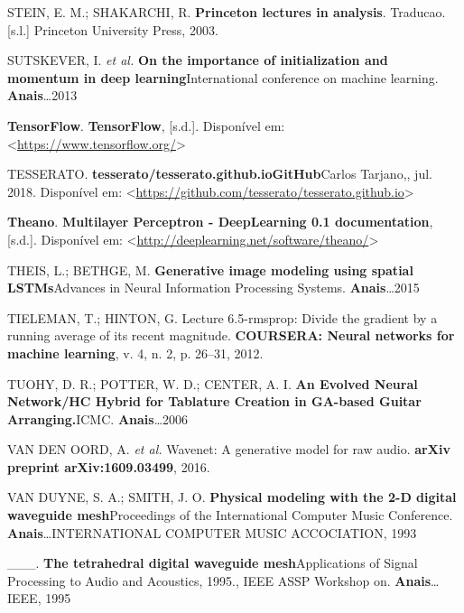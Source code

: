 \documentclass[]{article}
\begin{document}
\leavevmode\hypertarget{ref-stein2003princeton}{}%
STEIN, E. M.; SHAKARCHI, R. \textbf{Princeton lectures in analysis}.
Traducao. {[}s.l.{]} Princeton University Press, 2003.

\leavevmode\hypertarget{ref-sutskever2013importance}{}%
SUTSKEVER, I. \emph{et al.} \textbf{On the importance of initialization
and momentum in deep learning}International conference on machine
learning. \textbf{Anais}\ldots{}2013

\leavevmode\hypertarget{ref-tensorflow}{}%
\textbf{TensorFlow}. \textbf{TensorFlow}, {[}s.d.{]}. Disponível em:
\textless{}\url{https://www.tensorflow.org/}\textgreater{}

\leavevmode\hypertarget{ref-tesserato_2018}{}%
TESSERATO. \textbf{tesserato/tesserato.github.io}\textbf{GitHub}Carlos
Tarjano,, jul. 2018. Disponível em:
\textless{}\url{https://github.com/tesserato/tesserato.github.io}\textgreater{}

\leavevmode\hypertarget{ref-theano}{}%
\textbf{Theano}. \textbf{Multilayer Perceptron - DeepLearning 0.1
documentation}, {[}s.d.{]}. Disponível em:
\textless{}\url{http://deeplearning.net/software/theano/}\textgreater{}

\leavevmode\hypertarget{ref-theis2015generative}{}%
THEIS, L.; BETHGE, M. \textbf{Generative image modeling using spatial
LSTMs}Advances in Neural Information Processing Systems.
\textbf{Anais}\ldots{}2015

\leavevmode\hypertarget{ref-tieleman2012lecture}{}%
TIELEMAN, T.; HINTON, G. Lecture 6.5-rmsprop: Divide the gradient by a
running average of its recent magnitude. \textbf{COURSERA: Neural
networks for machine learning}, v. 4, n. 2, p. 26--31, 2012.

\leavevmode\hypertarget{ref-tuohy2006evolved}{}%
TUOHY, D. R.; POTTER, W. D.; CENTER, A. I. \textbf{An Evolved Neural
Network/HC Hybrid for Tablature Creation in GA-based Guitar
Arranging.}ICMC. \textbf{Anais}\ldots{}2006

\leavevmode\hypertarget{ref-van2016wavenet}{}%
VAN DEN OORD, A. \emph{et al.} Wavenet: A generative model for raw
audio. \textbf{arXiv preprint arXiv:1609.03499}, 2016.

\leavevmode\hypertarget{ref-van1993physical}{}%
VAN DUYNE, S. A.; SMITH, J. O. \textbf{Physical modeling with the 2-D
digital waveguide mesh}Proceedings of the International Computer Music
Conference. \textbf{Anais}\ldots{}INTERNATIONAL COMPUTER MUSIC
ACCOCIATION, 1993

\leavevmode\hypertarget{ref-van1995tetrahedral}{}%
\_\_\_. \textbf{The tetrahedral digital waveguide mesh}Applications of
Signal Processing to Audio and Acoustics, 1995., IEEE ASSP Workshop on.
\textbf{Anais}\ldots{}IEEE, 1995
\end{document}
